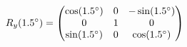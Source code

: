 \documentclass[preview]{standalone}
\begin{document}
\begin{align*}
\special{dvisvgm:raw <g id='unique000'>}R_y(1.5^\circ) = \begin{pmatrix} \cos(1.5^\circ) & 0 & -\sin(1.5^\circ) \\ 0 & 1 & 0 \\ \sin(1.5^\circ) & 0 & \cos(1.5^\circ) \end{pmatrix}\special{dvisvgm:raw </g>}
\end{align*}
\end{document}
